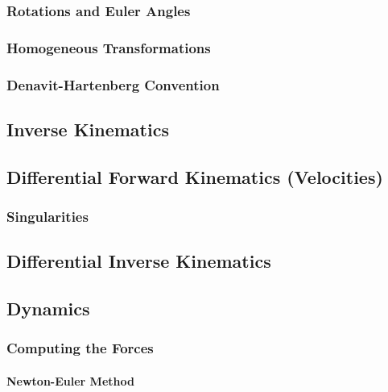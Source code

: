 			\subsubsection{Rotations and Euler Angles} %

			\subsubsection{Homogeneous Transformations} %

			\subsubsection{Denavit-Hartenberg Convention} %

		\subsection{Inverse Kinematics} %

		\subsection{Differential Forward Kinematics (Velocities)} %

			\subsubsection{Singularities} %

		\subsection{Differential Inverse Kinematics} %

		\subsection{Dynamics} %

			\subsubsection{Computing the Forces} %

				\paragraph{Newton-Euler Method} %

